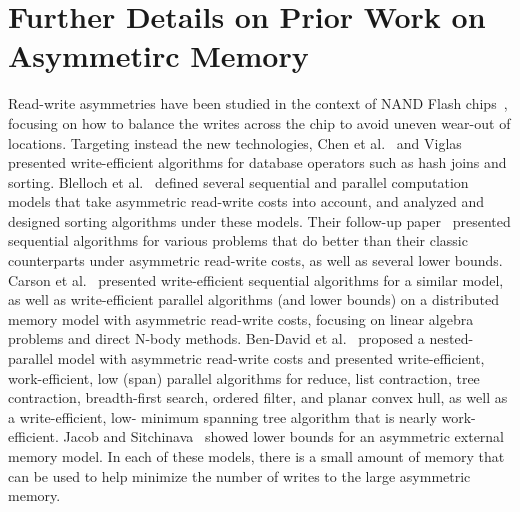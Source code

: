 \section{Further Details on Prior Work on Asymmetirc Memory}
\label{sec:priorwork}

Read-write asymmetries have been studied in the context of NAND Flash
chips~\cite{BT06, Eppstein14, Gal05, ParkS09}, focusing on how to
balance the writes across the chip to avoid uneven wear-out of
locations.  Targeting instead the new technologies, Chen et
al.~\cite{Chen11} and Viglas~\cite{Viglas12, Viglas14} presented
write-efficient algorithms for database operators such as hash joins
and sorting.  Blelloch et al.~\cite{BFGGS15} defined several
sequential and parallel computation models that take asymmetric
read-write costs into account, and analyzed and designed sorting
algorithms under these models.  Their follow-up
paper~\cite{blelloch2016efficient} presented sequential algorithms for
various problems that do better than their classic counterparts under
asymmetric read-write costs, as well as several lower bounds.  Carson
et al.~\cite{carson2016write} presented write-efficient sequential
algorithms for a similar model, as well as write-efficient parallel
algorithms (and lower bounds) on a distributed memory model with
asymmetric read-write costs, focusing on linear algebra problems and
direct N-body methods.  Ben-David et al.~\cite{BBFGGMS16} proposed a
nested-parallel model with asymmetric read-write costs and presented
write-efficient, work-efficient, low \depth{} (span) parallel
algorithms for reduce, list contraction, tree contraction,
breadth-first search, ordered filter, and planar convex hull, as well
as a write-efficient, low-\depth{} minimum spanning tree algorithm
that is nearly work-efficient.  Jacob and Sitchinava~\cite{jacob2017}
showed lower bounds for an asymmetric external memory model.  In each
of these models, there is a small amount of \local{} memory that can
be used to help minimize the number of writes to the large asymmetric
memory.
